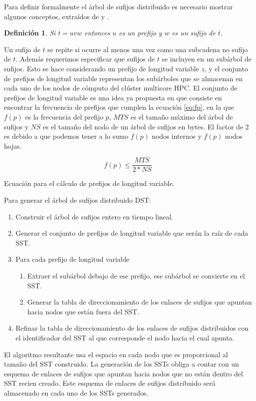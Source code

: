 \documentclass[12pt,a4paper]{article}
\newtheorem{mydef}{Definición}
\begin{document}
\indent
Para definir formalmente el árbol de sufijos distribuido es necesario mostrar
algunos conceptos, extraídos de \cite{Clifford2005} y \cite{Ghoting2010}. 
\begin{mydef}
  Si $t=uvw$ entonces $u$ es un \textit{prefijo} y $w$ es un \textit{sufijo}
de $t$.
\end{mydef}
\indent
Un sufijo de $t$ se repite si ocurre al menos una vez como una subcadena no sufijo de $t$.
Además requerimos especificar que sufijos de $t$ se incluyen en un subárbol de sufijos. Esto
se hace considerando un prefijo de longitud variable $z$, y el conjunto de prefijos de longitud variable representan 
los subárboles que se almacenan en cada uno de los nodos de cómputo del clúster multicore HPC. El conjunto de prefijos de longitud variable es una idea ya propuesta en \cite{Ghoting2010} que consiste en encontrar la frecuencia de prefijos que cumplen la ecuación \ref{eq:fp}, en la que $f(p)$ es la frecuencia del prefijo $p$, $MTS$ es el tamaño máximo del árbol de sufijos y $NS$ es el tamaño del nodo de un árbol de sufijos en bytes. El factor de 2 es debido a que podemos tener a lo sumo $f(p)$ nodos internos y $f(p)$ nodos hojas.
\begin{center}
\begin{myeq}[!ht]
\begin{equation}
f(p)\le \frac{MTS}{2*NS}
\end{equation}
\caption{Ecuación para el cálculo de prefijos de longitud variable.}
\end{myeq}
\label{eq:fp}
\end{center}
Para generar el árbol de sufijos distribuido DST:
\begin{enumerate}
\item Construir el árbol de sufijos entero en tiempo lineal.
\item Generar el conjunto de prefijos de longitud variable que serán la raíz de cada SST.
\item Para cada prefijo de longitud variable
\begin{enumerate}
\item Extraer el subárbol debajo de ese prefijo, ese subárbol se convierte en el SST.
\item Generar la tabla de direccionamiento de los enlaces de sufijos que apuntan hacia nodos que están fuera del SST. 
\end{enumerate}
\item Refinar la tabla de direccionamiento de los enlaces de sufijos distribuidos con el identificador del SST al que corresponde el nodo hacia el cual apunta.
\end{enumerate}
\indent
El algoritmo resultante usa el espacio en cada nodo que es proporcional al tamaño del SST construido. La generación de los SSTs obliga a contar con un esquema de enlaces de sufijos que apuntan hacia nodos que no están dentro del SST recien creado. Este esquema de enlaces de sufijos distribuido será almacenado en cada uno de los SSTs generados.
\end{document}
